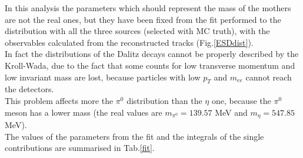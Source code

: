 \documentclass[a4paper,twocolumn,gsifonts,twoside]{gsipaper}
\begin{document}
In this analysis the parameters which should represent the mass of the mothers are not the real ones, but they have been fixed from the
fit performed to the distribution with all the three sources (selected with MC truth), with the observables calculated from the 
reconstructed tracks (Fig.\ref{ESDdist}). \\
In fact the distributions of the Dalitz decays cannot be properly described by the Kroll-Wada, due to the fact that some counts for 
low transverse momentum and low invariant mass are lost, because particles with low $p_{T}$ and $m_{ee}$ cannot reach the detectors.\\
This problem affects more the $\pi^{0}$ distribution than the $\eta$ one, because the $\pi^{0}$ meson has a lower mass (the real values 
are $m_{\pi^{0}} = 139.57$ MeV and $m_{\eta} = 547.85$ MeV).\\ 

The values of the parameters from the fit and the integrals of the single contributions are summarised in Tab.\ref{fit}.
\begin{table}[htpb]
\center
\caption{Amount of $e^{+}e^{-}$ pairs from the three sources, obtained from the fit of the MC distribution}\label{fit}
\fontsize{10}{3}
\end{table}
\end{document}
